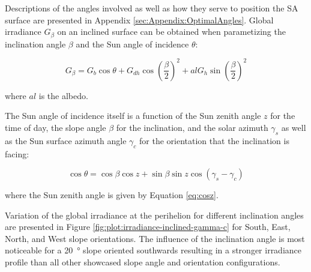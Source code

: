 Descriptions of the angles involved as well as how they serve to position the \ac{SA} surface are presented in Appendix \ref{sec:Appendix:OptimalAngles}. Global irradiance $G_{\beta}$ on an inclined surface can be obtained when parametizing the inclination angle $\beta$ and the Sun angle of incidence $\theta$:

\begin{equation}
  \label{eq:G_beta}
  G_{\beta} = G_{b}\cos{\theta} + G_{dh}\cos{\left(\frac{\beta}{2}\right)}^2 + al G_{h} \sin{\left(\frac{\beta}{2}\right)}^2
\end{equation}

where $al$ is the albedo.

The Sun angle of incidence itself is a function of the Sun zenith angle $z$ for the time of day, the slope angle $\beta$ for the inclination, and the solar azimuth $\gamma_{s}$ as well as the Sun surface azimuth angle $\gamma_{c}$ for the orientation that the inclination is facing:

\begin{equation}
  \label{eq:costheta}
  \cos{\theta} = \cos{\beta}\cos{z} +  \sin{\beta}\sin{z}\cos{(\gamma_{s} - \gamma_{c})}
\end{equation}

where the Sun zenith angle is given by Equation \ref{eq:cosz}.

Variation of the global irradiance at the perihelion for different inclination angles are presented in Figure \ref{fig:plot:irradiance-inclined-gamma-c} for South, East, North, and West slope orientations. The influence of the inclination angle is most noticeable for a \SI{20}{\degree} slope oriented southwards resulting in a stronger irradiance profile than all other showcased slope angle and orientation configurations.

